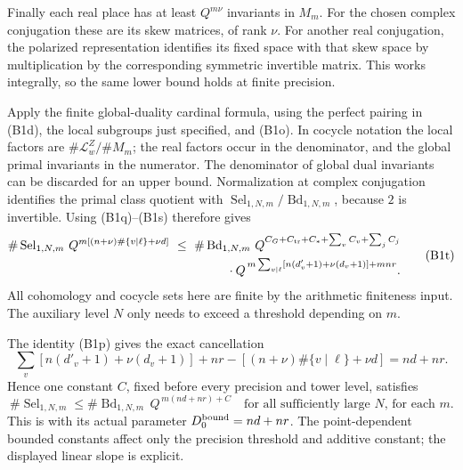 Finally each real place has at least \(Q^{m\nu}\) invariants
in \(M_m\).
For the chosen complex conjugation these are its skew matrices,
of rank \(\nu\).
For another real conjugation, the polarized representation
identifies its fixed space with that skew space by multiplication
by the corresponding symmetric invertible matrix.
This works integrally, so the same lower bound holds at
finite precision.

Apply the finite global-duality cardinal formula, using the
perfect pairing in (B1d), the local subgroups just specified,
and (B1o).
In cocycle notation the local factors are
\(\#\mathcal L^Z_w/\#M_m\); the real factors occur in the
denominator, and the global primal invariants in the numerator.
The denominator of global dual invariants can be discarded
for an upper bound.
Normalization at complex conjugation identifies the primal
class quotient with
\(\operatorname{Sel}_{1,N,m}/\operatorname{Bd}_{1,N,m}\),
because \(2\) is invertible.
Using (B1q)--(B1s) therefore gives
\[
 \begin{split}
 \#\operatorname{Sel}_{1,N,m}\,
   Q^{m[(n+\nu)\#\{v\mid\ell\}+\nu d]}
 \ \leq\ 
 \#\operatorname{Bd}_{1,N,m}\,
 Q^{C_G+C_{\rm tr}+C_*+\sum_vC_v+\sum_jC_j}\\
 {}\cdot
 Q^{\,m\sum_{v\mid\ell}
        [n(d'_v+1)+\nu(d_v+1)]+mnr}.
 \end{split}
 \tag{B1t}
\]
All cohomology and cocycle sets here are finite by the
arithmetic finiteness input.
The auxiliary level \(N\) only needs to exceed a threshold
depending on \(m\).

The identity (B1p) gives the exact cancellation
\[
 \sum_v[n(d'_v+1)+\nu(d_v+1)]+nr
       -[(n+\nu)\#\{v\mid\ell\}+\nu d]=nd+nr .
\]
Hence one constant \(C\), fixed before every precision and
tower level, satisfies
\[
 \boxed{\ 
 \#\operatorname{Sel}_{1,N,m}
 \leq\#\operatorname{Bd}_{1,N,m}\,
                       Q^{\,m(nd+nr)+C}
 \quad\text{for all sufficiently large \(N\), for each \(m\)}.
       \ }
 \tag{B1u}
\]
This is  with its actual parameter
\(D_0^{\rm bound}=nd+nr\).
The point-dependent bounded constants affect only the
precision threshold and additive constant; the displayed
linear slope is explicit.

